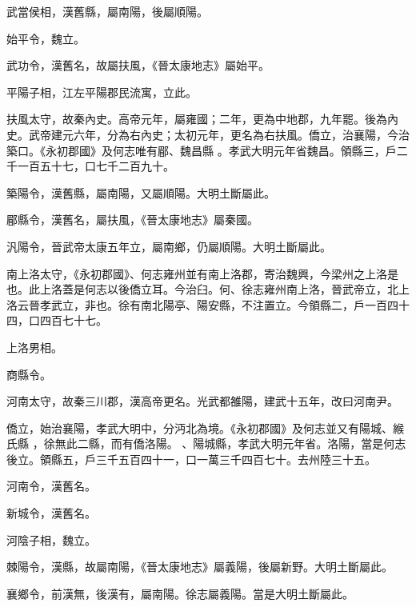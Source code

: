 \begin{pinyinscope}
 武當侯相，漢舊縣，屬南陽，後屬順陽。



 始平令，魏立。



 武功令，漢舊名，故屬扶風，《晉太康地志》屬始平。



 平陽子相，江左平陽郡民流寓，立此。


扶風太守，故秦內史。高帝元年，屬雍國；二年，更為中地郡，九年罷。後為內史。武帝建元六年，分為右內史；太初元年，更名為右扶風。僑立，治襄陽，今治築口。《永初郡國》及何志唯有郿、魏昌縣
 。孝武大明元年省魏昌。領縣三，戶二千一百五十七，口七千二百九十。



 築陽令，漢舊縣，屬南陽，又屬順陽。大明土斷屬此。



 郿縣令，漢舊名，屬扶風，《晉太康地志》屬秦國。



 汎陽令，晉武帝太康五年立，屬南鄉，仍屬順陽。大明土斷屬此。



 南上洛太守，《永初郡國》、何志雍州並有南上洛郡，寄治魏興，今梁州之上洛是也。此上洛蓋是何志以後僑立耳。今治臼。何、徐志雍州南上洛，晉武帝立，北上洛云晉孝武立，非也。徐有南北陽亭、陽安縣，不注置立。今領縣二，戶一百四十四，口四百七十七。


上洛男相。


商縣令。



 河南太守，故秦三川郡，漢高帝更名。光武都雒陽，建武十五年，改曰河南尹。


僑立，始治襄陽，孝武大明中，分沔北為境。《永初郡國》及何志並又有陽城、緱氏縣
 ，徐無此二縣，而有僑洛陽。
 、陽城縣，孝武大明元年省。洛陽，當是何志後立。領縣五，戶三千五百四十一，口一萬三千四百七十。去州陸三十五。



 河南令，漢舊名。



 新城令，漢舊名。



 河陰子相，魏立。



 棘陽令，漢縣，故屬南陽，《晉太康地志》屬義陽，後屬新野。大明土斷屬此。



 襄鄉令，前漢無，後漢有，屬南陽。徐志屬義陽。當是大明土斷屬此。



\end{pinyinscope}
